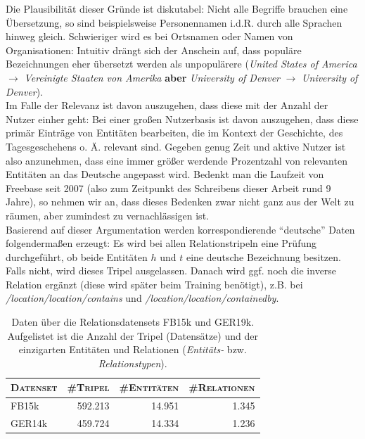 Die Plausibilität dieser Gründe ist diskutabel: Nicht alle Begriffe brauchen eine Übersetzung, so sind beispielsweise
Personennamen i.d.R. durch alle Sprachen hinweg gleich. Schwieriger wird es bei Ortsnamen oder Namen von Organisationen:
Intuitiv drängt sich der Anschein auf, dass populäre Bezeichnungen eher übersetzt werden als unpopulärere
(\emph{United States of America} $\rightarrow$ \emph{Vereinigte Staaten von Amerika} \textbf{aber} \emph{University of Denver}
$\rightarrow$ \emph{University of Denver}).\\
Im Falle der Relevanz ist davon auszugehen, dass diese mit der Anzahl der Nutzer einher geht: Bei einer großen
Nutzerbasis ist davon auszugehen, dass diese primär Einträge von Entitäten bearbeiten, die im Kontext der Geschichte,
des Tagesgeschehens o. Ä. relevant sind. Gegeben genug Zeit und aktive Nutzer ist also anzunehmen, dass eine immer
größer werdende Prozentzahl von relevanten Entitäten an das Deutsche angepasst wird. Bedenkt man die Laufzeit von Freebase
seit 2007 (also zum Zeitpunkt des Schreibens dieser Arbeit rund 9 Jahre), so nehmen wir an, dass dieses Bedenken zwar nicht
ganz aus der Welt zu räumen, aber zumindest zu vernachlässigen ist.\\

Basierend auf dieser Argumentation werden korrespondierende ``deutsche'' Daten folgendermaßen erzeugt:
Es wird bei allen Relationstripeln eine Prüfung durchgeführt, ob beide Entitäten $h$ und $t$ eine deutsche Bezeichnung
besitzen. Falls nicht, wird dieses Tripel ausgelassen. Danach wird ggf. noch die inverse Relation ergänzt (diese wird
später beim Training benötigt), z.B. bei \emph{/location/location/contains} und \emph{/location/location/containedby}.

\begin{table}[h]
  \centering
  \def\arraystretch{1.5}
  \begin{tabular}{@{}lrrr@{}}
    \toprule
    \textsc{Datenset} & \textsc{\#Tripel} & \textsc{\#Entitäten} & \textsc{\#Relationen} \\
    \toprule
    FB15k & 592.213 & 14.951 & 1.345 \\
    GER14k & 459.724 & 14.334 & 1.236 \\
    \bottomrule
  \end{tabular}
  \caption[Daten über die Relationsdatensets FB15k und GER14k]{Daten über die Relationsdatensets FB15k und GER19k.
  Aufgelistet ist die Anzahl der Tripel (Datensätze) und der einzigarten Entitäten und Relationen (\emph{Entitäts-} bzw.
  \emph{Relationstypen}).\label{fig:fb15kger14k}}
\end{table}


